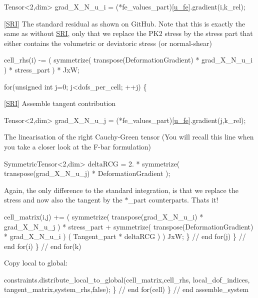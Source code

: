 \begin{DoxyCode}
Tensor<2,dim> grad\_X\_N\_u\_i = (*fe\_values\_part)[\hyperlink{assembly__routine__SRI_8cc_ae50a49c136e49c33fcd5a555a00009dd}{u\_fe}].gradient(i,k\_rel);
\end{DoxyCode}
 \mbox{[}\hyperlink{namespaceSRI}{S\+RI}\mbox{]} The standard residual as shown on Git\+Hub. Note that this is exactly the same as without \hyperlink{namespaceSRI}{S\+RI}, only that we replace the P\+K2 stress by the stress part  that either contains the volumetric or deviatoric stress (or normal-\/shear) 
\begin{DoxyCode}
cell\_rhs(i) -= ( symmetrize( transpose(DeformationGradient) * grad\_X\_N\_u\_i ) * stress\_part ) * JxW;

\textcolor{keywordflow}{for}(\textcolor{keywordtype}{unsigned} \textcolor{keywordtype}{int} j=0; j<dofs\_per\_cell; ++j)
\{
\end{DoxyCode}
 \mbox{[}\hyperlink{namespaceSRI}{S\+RI}\mbox{]} Assemble tangent contribution 
\begin{DoxyCode}
Tensor<2,dim> grad\_X\_N\_u\_j = (*fe\_values\_part)[\hyperlink{assembly__routine__SRI_8cc_ae50a49c136e49c33fcd5a555a00009dd}{u\_fe}].gradient(j,k\_rel);
\end{DoxyCode}
 The linearisation of the right Cauchy-\/\+Green tensor (You will recall this line when you take a closer look at the F-\/bar formulation) 
\begin{DoxyCode}
SymmetricTensor<2,dim> deltaRCG = 2. * symmetrize( transpose(grad\_X\_N\_u\_j) * DeformationGradient );
\end{DoxyCode}
 Again, the only difference to the standard integration, is that we replace the stress and now also the tangent by the $\ast$\+\_\+part counterparts. That\textquotesingle{}s it! 
\begin{DoxyCode}
            cell\_matrix(i,j) += (
                                    symmetrize( transpose(grad\_X\_N\_u\_i) * grad\_X\_N\_u\_j ) * stress\_part
                                    +
                                    symmetrize( transpose(DeformationGradient) * grad\_X\_N\_u\_i )
                                      ( Tangent\_part * deltaRCG )
                                )
                                  JxW;
        \} \textcolor{comment}{// end for(j)}
     \} \textcolor{comment}{// end for(i)}
\} \textcolor{comment}{// end for(k)}
\end{DoxyCode}
 Copy local to global\+: 
\begin{DoxyCode}
        constraints.distribute\_local\_to\_global(cell\_matrix,cell\_rhs,
                                local\_dof\_indices,
                                tangent\_matrix,system\_rhs,\textcolor{keyword}{false});
    \} \textcolor{comment}{// end for(cell)}
\} \textcolor{comment}{// end assemble\_system}
\end{DoxyCode}
